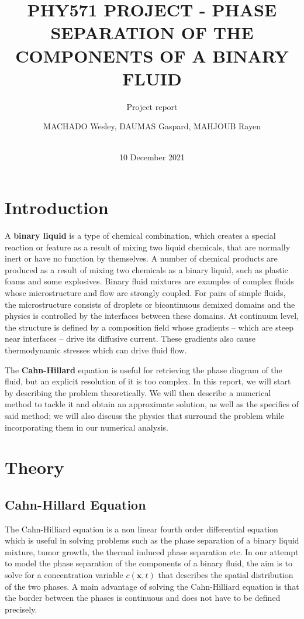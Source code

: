 \documentclass[11pt,a4paper]{report}
\title[]{PHY571 PROJECT - PHASE SEPARATION OF THE COMPONENTS OF A BINARY FLUID
}
\subtitle{Project report}
\author{ 
\begin{tabular}{c}
MACHADO Wesley, DAUMAS Gaspard, MAHJOUB Rayen
\end{tabular} \\[\baselineskip] 
}
\date{10 December 2021}
\begin{document}
\maketitle


\small{\tableofcontents}

\newpage

\chapter*{Introduction}

A \textbf{binary liquid} is a type of chemical combination, which creates a special reaction or feature as a result of mixing two liquid chemicals, that are normally inert or have no function by themselves. A number of chemical products are produced as a result of mixing two chemicals as a binary liquid, such as plastic foams and some explosives. Binary fluid mixtures are examples of complex fluids whose microstructure and flow are strongly coupled. For pairs of simple fluids, the microstructure consists of droplets or bicontinuous demixed domains and the physics is controlled by the interfaces between these domains. At continuum level, the structure is defined by a composition field whose gradients – which are steep near interfaces – drive its diffusive current. These gradients also cause thermodynamic stresses which can drive fluid flow.

The \textbf{Cahn-Hillard} equation is useful for retrieving the phase diagram of the fluid, but an explicit resolution of it is too complex. In this report, we will start by describing the problem theoretically. We will then describe a numerical method to tackle it and obtain an approximate solution, as well as the specifics of said method; we will also discuss the physics that surround the problem while incorporating them in our numerical analysis.

\chapter{Theory}
\section{Cahn-Hillard Equation}
The Cahn-Hilliard equation is a non linear fourth order differential equation which is useful in solving problems such as the phase separation of a binary liquid mixture, tumor growth, the thermal induced phase separation etc. In our attempt to model the phase separation of the components of a binary fluid, the aim is to solve for a concentration variable $c(\mathbf{x}, t)$ that describes the spatial distribution of the two phases. A main advantage of solving the Cahn-Hilliard equation is that the border between the phases is continuous and does not have to be defined precisely.
\end{document}
